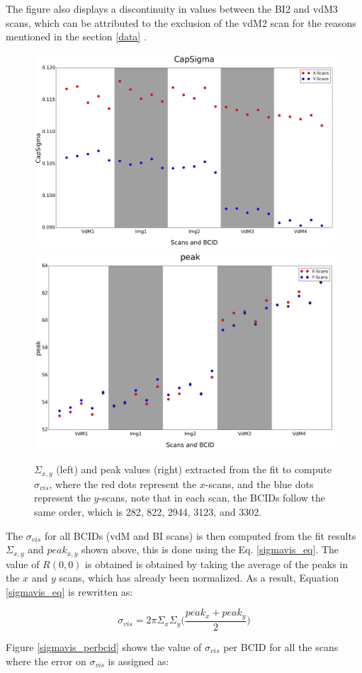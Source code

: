 The figure also displays a discontinuity in values between the BI2 and vdM3 scans, which can be attributed to the exclusion of the vdM2 scan for the reasons mentioned in the section \ref{data} . 

\begin{center}
  \begin{figure}[h!]
    \centering
    \includegraphics[width=.49\textwidth]{Chapter4/DGConst_CapSigma.png}
    \includegraphics[width=.48\textwidth]{Chapter4/DGConst_peak.png}
    \caption[$\Sigma_{x,y}$ and peak values for all scan pairs]{$\Sigma_{x,y}$ (left) and peak values (right) extracted from the fit to compute $\sigma_{vis}$, where the red dots represent the $x$-scans, and the blue dots represent the $y$-scans, note that in each scan, the BCIDs follow the same order, which is 282, 822, 2944, 3123, and 3302.} 
    \label{capsigma_peak}
  \end{figure}
\end{center}

The $\sigma_{vis}$ for all BCIDs (vdM and BI scans) is then computed from the fit results $\Sigma_{x,y}$ and $peak_{x,y}$ shown above, this is done using the Eq. \ref{sigmavis_eq}. The value of $R(0,0)$ is obtained is obtained by taking the average of the peaks in the $x$ and $y$ scans, which has already been normalized. As a result, Equation \ref{sigmavis_eq} is rewritten as:

\begin{equation}
 \sigma_{vis}= 2\pi \Sigma_{x} \Sigma_{y} \Biggl( \frac{peak_{x}+peak_{y}}{2} \Biggr)
 \end{equation}

Figure \ref{sigmavis_perbcid} shows the  value of $\sigma_{vis}$ per BCID for all the scans where the error on $\sigma_{vis}$ is assigned as: 


